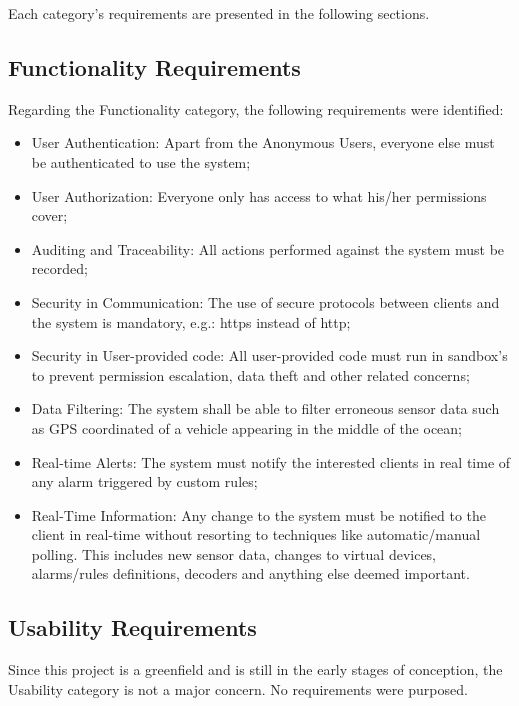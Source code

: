Each category's requirements are presented in the following sections. 

\subsection{Functionality Requirements}
\label{sec:requirements:non_functional:functionality}

Regarding the Functionality category, the following requirements were identified:

\begin{itemize}
    \item User Authentication: Apart from the Anonymous Users, everyone else must be authenticated to use the system;
    \item User Authorization: Everyone only has access to what his/her permissions cover;
    \item Auditing and Traceability: All actions performed against the system must be recorded;
    \item Security in Communication: The use of secure protocols between clients and the system is mandatory, e.g.: https instead of http;
    \item Security in User-provided code: All user-provided code must run in sandbox's to prevent permission escalation, data theft and other related concerns;
    \item Data Filtering: The system shall be able to filter erroneous sensor data such as GPS coordinated of a vehicle appearing in the middle of the ocean;
    \item Real-time Alerts: The system must notify the interested clients in real time of any alarm triggered by custom rules;
    \item Real-Time Information: Any change to the system must be notified to the client in real-time without resorting to techniques like automatic/manual polling. This includes new sensor data, changes to virtual devices, alarms/rules definitions, decoders and anything else deemed important.
\end{itemize}

\subsection{Usability Requirements}
\label{sec:requirements:non_functional:usability}

Since this project is a greenfield and is still in the early stages of conception, the Usability category is not a major concern. No requirements were purposed.

